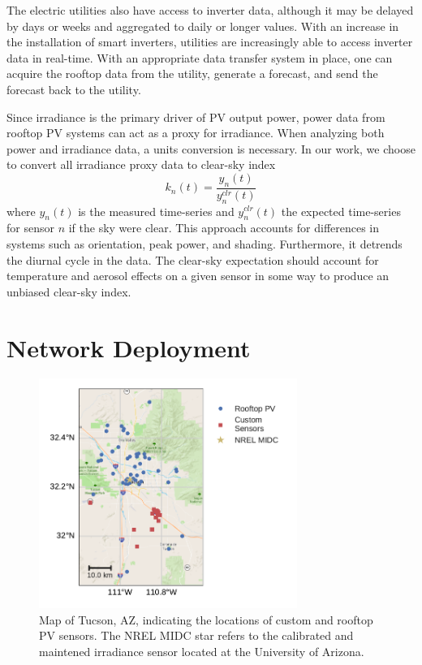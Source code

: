 The electric utilities also have access to inverter data, although it
may be delayed by days or weeks and aggregated to daily or longer values.
With an increase in the installation of smart inverters, utilities are
increasingly able to access inverter data in real-time.
With an appropriate data transfer system in place, one can acquire
the rooftop data from the utility, generate a forecast, and send the
forecast back to the utility.

Since irradiance is the primary driver of PV output power, power data
from rooftop PV systems can act as a proxy for irradiance.
When analyzing both power and irradiance data, a units conversion is
necessary.
In our work, we choose to convert all irradiance proxy data to
clear-sky index
\begin{equation}
\label{eq:clrind}
k_n(t) = \frac{y_n(t)}{y_n^{clr}(t)}
\end{equation}
where $y_n(t)$ is the measured time-series and $y_n^{clr}(t)$ the
expected time-series for sensor $n$ if the sky were clear.
This approach accounts for differences in systems such as orientation,
peak power, and shading.
Furthermore, it detrends the diurnal cycle in the data.
The clear-sky expectation should account for temperature and aerosol
effects on a given sensor in some way to produce an unbiased clear-sky
index.

\section{Network Deployment}
\begin{figure}[h]
\centering
\includegraphics[width=0.75\textwidth]{figs/map.pdf}
\caption[Map of sensor locations]{Map of Tucson, AZ, indicating the
  locations of custom and rooftop PV sensors. The NREL MIDC star
  refers to the calibrated and maintened irradiance sensor located at
  the University of Arizona.}
\label{fig:map}
\end{figure}

